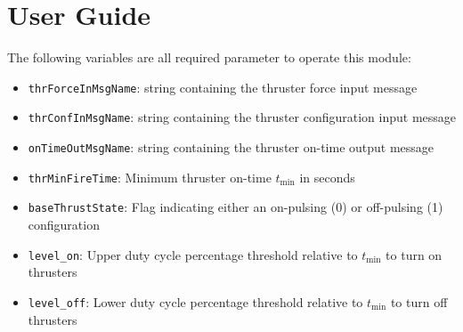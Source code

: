 
\section{User Guide}
The following variables are all required parameter to operate this module:
\begin{itemize}
	\item {\tt thrForceInMsgName}:  string containing the thruster force input message
	\item {\tt thrConfInMsgName}:  string containing the thruster configuration input message
	\item {\tt onTimeOutMsgName}:  string containing the thruster on-time output message
	\item {\tt thrMinFireTime}:  Minimum thruster on-time $t_{\text{min}}$ in seconds
	\item {\tt baseThrustState}:  Flag indicating either an on-pulsing (0) or off-pulsing (1) configuration
	\item {\tt level\_on}:   Upper duty cycle percentage threshold relative to $t_{\text{min}}$ to turn on thrusters
	\item {\tt level\_off}:  Lower duty cycle percentage threshold relative to $t_{\text{min}}$ to turn off thrusters
\end{itemize}
